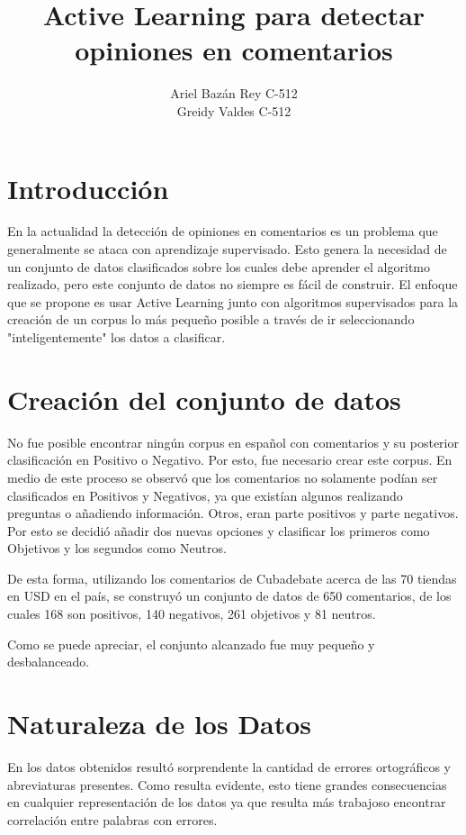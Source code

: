 \documentclass[]{article}
\title{\huge Active Learning para detectar opiniones en comentarios}
\author{Ariel Bazán Rey C-512 \\ Greidy Valdes C-512}
\date{}
\begin{document}
\maketitle

\section{Introducción}

En la actualidad la detección de opiniones en comentarios es un problema que generalmente se ataca con aprendizaje supervisado. Esto genera la necesidad de un conjunto de datos clasificados sobre los cuales debe aprender el algoritmo realizado, pero este conjunto de datos no siempre es fácil de construir. El enfoque que se propone es usar Active Learning junto con algoritmos supervisados para la creación de un corpus lo más pequeño posible a través de ir seleccionando "inteligentemente" los datos a clasificar.

\section{Creación del conjunto de datos}

No fue posible encontrar ningún corpus en español con comentarios y su posterior clasificación en Positivo o Negativo. Por esto, fue necesario crear este corpus. En medio de este proceso se observó que los comentarios no solamente podían ser clasificados en Positivos y Negativos, ya que existían algunos realizando preguntas o añadiendo información. Otros, eran parte positivos y parte negativos. Por esto se decidió añadir dos nuevas opciones y clasificar los primeros como Objetivos y los segundos como Neutros.

De esta forma, utilizando los comentarios de Cubadebate acerca de las 70 tiendas en USD en el país, se construyó un conjunto de datos de 650 comentarios, de los cuales 168 son positivos, 140 negativos, 261 objetivos y 81 neutros.

Como se puede apreciar, el conjunto alcanzado fue muy pequeño y desbalanceado.

\section{Naturaleza de los Datos}

En los datos obtenidos resultó sorprendente la cantidad de errores ortográficos y abreviaturas presentes. Como resulta evidente, esto tiene grandes consecuencias en cualquier representación de los datos ya que resulta más trabajoso encontrar correlación entre palabras con errores.
\end{document}
